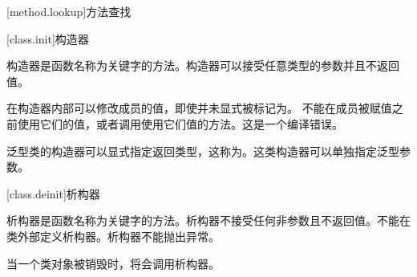 [method.lookup]{方法查找}

\pnum

[class.init]{构造器}

\pnum
构造器是函数名称为关键字的方法。构造器可以接受任意类型的参数并且不返回值。

\pnum
在构造器内部可以修改成员的值，即使并未显式被标记为。
不能在成员被赋值之前使用它们的值，或者调用使用它们值的方法。这是一个编译错误。

\pnum
泛型类的构造器可以显式指定返回类型，这称为。这类构造器可以单独指定泛型参数。

[class.deinit]{析构器}

\pnum
析构器是函数名称为关键字的方法。析构器不接受任何非参数且不返回值。不能在类外部定义析构器。析构器不能抛出异常。

\pnum
当一个类对象被销毁时，将会调用析构器。
